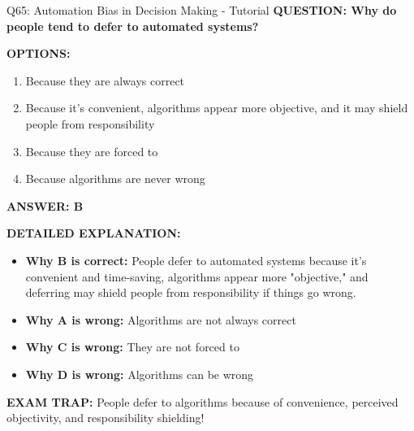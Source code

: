 \documentclass[8pt]{beamer}
\begin{document}
	\begin{frame}{Q65: Automation Bias in Decision Making - Tutorial}
		\fontsize{6.5}{7.5}\selectfont
		\textbf{QUESTION: Why do people tend to defer to automated systems?}
		
		\vspace{0.1cm}
		\textbf{OPTIONS:}
		\begin{enumerate}
			\item Because they are always correct
			\item Because it's convenient, algorithms appear more objective, and it may shield people from responsibility
			\item Because they are forced to
			\item Because algorithms are never wrong
		\end{enumerate}
		
		\vspace{0.1cm}
		\textcolor{myblue}{\textbf{ANSWER: B}}
		
		\vspace{0.1cm}
		\textbf{DETAILED EXPLANATION:}
		\begin{itemize}
			\item \textbf{Why B is correct:} People defer to automated systems because it's convenient and time-saving, algorithms appear more "objective," and deferring may shield people from responsibility if things go wrong.
			\item \textbf{Why A is wrong:} Algorithms are not always correct
			\item \textbf{Why C is wrong:} They are not forced to
			\item \textbf{Why D is wrong:} Algorithms can be wrong
		\end{itemize}
		
		\textcolor{myred}{\textbf{EXAM TRAP:}} People defer to algorithms because of \textcolor{myblue}{convenience, perceived objectivity, and responsibility shielding}!
	\end{frame}
	
\end{document}
